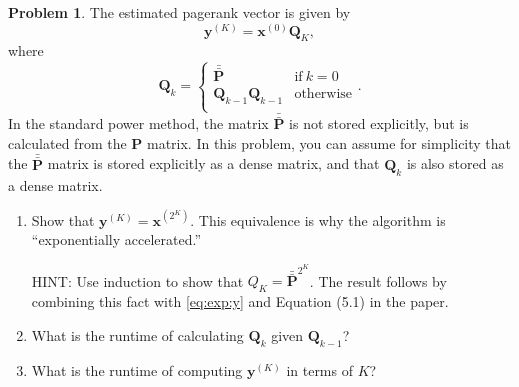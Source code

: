 \documentclass[10pt]{article}
\theoremstyle{definition}
\newtheorem{problem}{Problem}
\newcommand{\Q}{\mathbf Q}
\newcommand{\p}{\mathbf P}
\newcommand{\pb}{\bar {\p}}
\newcommand{\pbb}{\bar {\pb}}
\newcommand{\x}{\mathbf x}
\newcommand{\y}{\mathbf y}
\begin{document}
{\begin{problem}
    The estimated pagerank vector is given by
    \begin{equation}
        \label{eq:exp:y}
        \y^{(K)} = \x^{(0)} \Q_K
        ,
    \end{equation}
    where
    \begin{equation}
        \Q_k = 
        \begin{cases}
            \pbb & \text{if}~k=0 \\
            \Q_{k-1} \Q_{k-1} & \text{otherwise} \\
        \end{cases}
        .
    \end{equation}
    In the standard power method, the matrix $\pbb$ is not stored explicitly,
    but is calculated from the $\p$ matrix.
    In this problem, you can assume for simplicity that the $\pbb$ matrix is stored explicitly as a dense matrix,
    and that $\Q_k$ is also stored as a dense matrix.

    \begin{enumerate}
        \item
            Show that $\y^{(K)} = \x^{(2^K)}$.
            This equivalence is why the algorithm is ``exponentially accelerated.''

            HINT: 
            Use induction to show that $Q_{K} = \pbb^{2^{K}}$.
            The result follows by combining this fact with \eqref{eq:exp:y} and Equation (5.1) in the paper.
            \vspace{3in}

        \newpage
        \item
            What is the runtime of calculating $\Q_k$ given $\Q_{k-1}$? 
            \vspace{4in}

        \item 
            What is the runtime of computing $\y^{(K)}$ in terms of $K$?
            \vspace{3in}


\end{enumerate}
\end{problem}}
\end{document}
